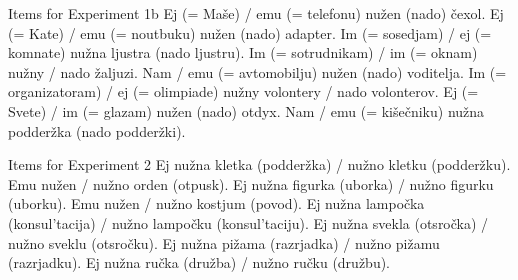 \documentclass[output=paper,colorlinks,citecolor=brown]{langscibook}
\begin{document}
\ea Items for Experiment 1b
\ea Ej (= Maše) / emu (= telefonu) nužen (nado) čexol.
\ex Ej (= Kate) / emu (= noutbuku) nužen (nado) adapter.
\ex  Im (= sosedjam) / ej (= komnate) nužna ljustra (nado ljustru).
\ex  Im (= sotrudnikam) / im (= oknam) nužny / nado žaljuzi.
\ex  Nam / emu (= avtomobilju) nužen (nado) voditelja.
\ex  Im (= organizatoram) / ej (= olimpiade) nužny volontery / nado volonterov.
\ex  Ej (= Svete) / im (= glazam) nužen (nado) otdyx.
\ex  Nam / emu (= kišečniku) nužna podderžka (nado podderžki).
\z \z

\ea Items for Experiment 2
\ea Ej nužna kletka (podderžka) / nužno  kletku (podderžku).
\ex Emu nužen / nužno  orden (otpusk).
\ex Ej nužna figurka (uborka) / nužno  figurku (uborku).
\ex Emu nužen / nužno  kostjum (povod).
\ex Ej nužna lampočka (konsul'tacija) / nužno  lampočku (konsul'taciju).
\ex Ej nužna svekla (otsročka) / nužno  sveklu (otsročku).
\ex Ej nužna pižama (razrjadka) / nužno  pižamu (razrjadku).
\ex Ej nužna ručka (družba) / nužno  ručku (družbu).
\z \z
\end{document}
